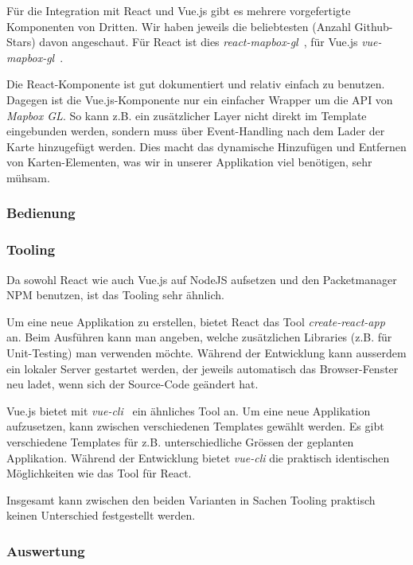 Für die Integration mit React und Vue.js gibt es mehrere vorgefertigte Komponenten von Dritten.
Wir haben jeweils die beliebtesten (Anzahl Github-Stars) davon angeschaut.
Für React ist dies \emph{react-mapbox-gl}~\cite{react_mapbox_gl}, für Vue.js \emph{vue-mapbox-gl}~\cite{vue_mapbox_gl}.

Die React-Komponente ist gut dokumentiert und relativ einfach zu benutzen.
Dagegen ist die Vue.js-Komponente nur ein einfacher Wrapper um die API von \emph{Mapbox GL}.
So kann z.B. ein zusätzlicher Layer nicht direkt im Template eingebunden werden, sondern muss über Event-Handling nach dem Lader der Karte hinzugefügt werden.
Dies macht das dynamische Hinzufügen und Entfernen von Karten-Elementen, was wir in unserer Applikation viel benötigen, sehr mühsam.

\subsubsection{Bedienung}
\label{Analyse Framework:Bedienung}



\subsubsection{Tooling}
\label{Analyse Framework:Tooling}

Da sowohl React wie auch Vue.js auf NodeJS aufsetzen und den Packetmanager NPM benutzen, ist das Tooling sehr ähnlich.

Um eine neue Applikation zu erstellen, bietet React das Tool \emph{create-react-app}~\cite{create_react_app} an.
Beim Ausführen kann man angeben, welche zusätzlichen Libraries (z.B. für Unit-Testing) man verwenden möchte.
Während der Entwicklung kann ausserdem ein lokaler Server gestartet werden, der jeweils automatisch das Browser-Fenster neu ladet, wenn sich der Source-Code geändert hat.

Vue.js bietet mit \emph{vue-cli}~\cite{vue_cli} ein ähnliches Tool an.
Um eine neue Applikation aufzusetzen, kann zwischen verschiedenen Templates gewählt werden.
Es gibt verschiedene Templates für z.B. unterschiedliche Grössen der geplanten Applikation.
Während der Entwicklung bietet \emph{vue-cli} die praktisch identischen Möglichkeiten wie das Tool für React.

Insgesamt kann zwischen den beiden Varianten in Sachen Tooling praktisch keinen Unterschied festgestellt werden.


\subsubsection{Auswertung}
\label{Analyse Framework:Auswertung}

